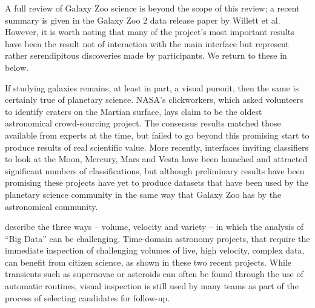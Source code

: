 \documentclass{ar2e}
\begin{document}

A full review of Galaxy Zoo science is beyond the scope of this review; a
recent summary is given in the Galaxy Zoo 2 data release paper by Willett et
al. However, it is worth noting that many of the project's most important
results have been the result not of interaction with the main interface but
represent rather serendipitous discoveries made by participants. We return to
these in  below.


If studying galaxies remains, at least in part, a visual pursuit, then the same
is certainly true of planetary science. NASA's clickworkers, which asked
volunteers to identify craters on the Martian surface, lays claim to be the
oldest astronomical crowd-sourcing project. The consensus results matched those
available from experts at the time, but failed to go beyond this promising start
to produce results of real scientific value. More recently, interfaces inviting
classifiers to look at the Moon, Mercury, Mars and Vesta have been launched and
attracted significant numbers of classifications, but although preliminary
results have been promising these projects have yet to produce datasets that
have been used by the planetary science community in the same way that Galaxy
Zoo has by the astronomical community. 





\citet{threeVs} describe the three ways -- volume, velocity and variety -- in
which the analysis of ``Big Data'' can be challenging. Time-domain astronomy
projects, that require the immediate inspection of challenging volumes of live,
high velocity, complex data, can benefit from citizen science, as shown in these
two recent projects.  While transients such as supernovae or asteroids can often
be found through the use of automatic routines, visual inspection is still used
by many teams as part of the process of selecting candidates for follow-up. 

\end{document}
